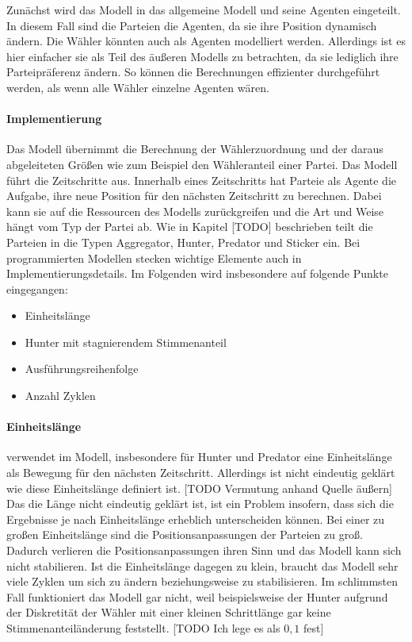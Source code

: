 Zunächst wird das Modell in das allgemeine Modell und seine Agenten eingeteilt. In diesem Fall sind die Parteien die Agenten, da sie ihre Position dynamisch ändern. Die Wähler könnten auch als Agenten modelliert werden. Allerdings ist es hier einfacher sie als Teil des äußeren Modells zu betrachten, da sie lediglich ihre Parteipräferenz ändern. So können die Berechnungen effizienter durchgeführt werden, als wenn alle Wähler einzelne Agenten wären.

\paragraph{Implementierung}Das Modell übernimmt die Berechnung der Wählerzuordnung und der daraus abgeleiteten Größen wie zum Beispiel den Wähleranteil einer Partei. Das Modell führt die Zeitschritte aus. Innerhalb eines Zeitschritts hat Parteie als Agente die Aufgabe, ihre neue Position für den nächsten Zeitschritt zu berechnen. Dabei kann sie auf die Ressourcen des Modells zurückgreifen und die Art und Weise hängt vom Typ der Partei ab. Wie in Kapitel [TODO] beschrieben teilt \cite{laver2005policy} die Parteien in die Typen Aggregator, Hunter, Predator und Sticker ein. Bei programmierten Modellen stecken wichtige Elemente auch in Implementierungsdetails. Im Folgenden wird insbesondere auf folgende Punkte eingegangen:
\begin{itemize}
\item Einheitslänge
\item Hunter mit stagnierendem Stimmenanteil
\item Ausführungsreihenfolge
\item Anzahl Zyklen
\end{itemize}

\paragraph{Einheitslänge}
\cite{laver2005policy} verwendet im Modell, insbesondere für Hunter und Predator eine Einheitslänge als Bewegung für den nächsten Zeitschritt. Allerdings ist nicht eindeutig geklärt wie diese Einheitslänge definiert ist.
[TODO Vermutung anhand Quelle äußern]
Das die Länge nicht eindeutig geklärt ist, ist ein Problem insofern, dass sich die Ergebnisse je nach Einheitslänge erheblich unterscheiden können. Bei einer zu großen Einheitslänge sind die Positionsanpassungen der Parteien zu groß. Dadurch verlieren die Positionsanpassungen ihren Sinn und das Modell kann sich nicht stabilieren. Ist die Einheitslänge dagegen zu klein, braucht das Modell sehr viele Zyklen um sich zu ändern beziehungsweise zu stabilisieren. Im schlimmsten Fall funktioniert das Modell gar nicht, weil beispielsweise der Hunter aufgrund der Diskretität der Wähler mit einer kleinen Schrittlänge gar keine Stimmenanteiländerung feststellt.
[TODO Ich lege es als $0,1$ fest]

